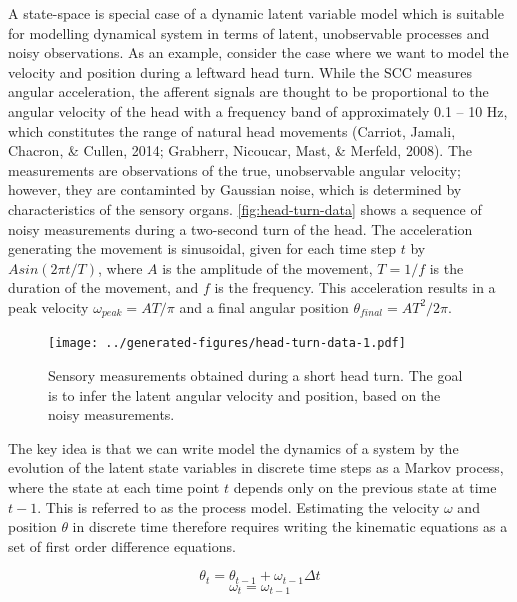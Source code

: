 \documentclass[english,floatsintext,man]{apa6}
\theoremstyle{definition}
\theoremstyle{definition}
\theoremstyle{remark}
\begin{document}
A state-space is special case of a dynamic latent variable model which
is suitable for modelling dynamical system in terms of latent,
unobservable processes and noisy observations. As an example, consider
the case where we want to model the velocity and position during a
leftward head turn. While the SCC measures angular acceleration, the
afferent signals are thought to be proportional to the angular velocity
of the head with a frequency band of approximately 0.1 -- 10 Hz, which
constitutes the range of natural head movements (Carriot, Jamali,
Chacron, \& Cullen, 2014; Grabherr, Nicoucar, Mast, \& Merfeld, 2008).
The measurements are observations of the true, unobservable angular
velocity; however, they are contaminted by Gaussian noise, which is
determined by characteristics of the sensory organs.
\autoref{fig:head-turn-data} shows a sequence of noisy measurements
during a two-second turn of the head. The acceleration generating the
movement is sinusoidal, given for each time step \(t\) by
\(Asin(2\pi t/T)\), where \(A\) is the amplitude of the movement,
\(T = 1/f\) is the duration of the movement, and \(f\) is the frequency.
This acceleration results in a peak velocity \(\omega_{peak} = AT/\pi\)
and a final angular position \(\theta_{final} = AT^2/2\pi\).

\begin{no-prefix-figure-caption}

\begin{figure}
\centering
\texttt{[image: ../generated-figures/head-turn-data-1.pdf]}
\caption{\label{fig:head-turn-data}Sensory measurements obtained during a
short head turn. The goal is to infer the latent angular velocity and
position, based on the noisy measurements. \label{fig:head-turn}}
\end{figure}

\end{no-prefix-figure-caption}

The key idea is that we can write model the dynamics of a system by the
evolution of the latent state variables in discrete time steps as a
Markov process, where the state at each time point \(t\) depends only on
the previous state at time \(t-1\). This is referred to as the process
model. Estimating the velocity \(\omega\) and position \(\theta\) in
discrete time therefore requires writing the kinematic equations as a
set of first order difference equations.

\[\theta_t = \theta_{t-1} + \omega_{t-1} \Delta t\]
\[\omega_{t} = \omega_{t-1}\]
\end{document}
